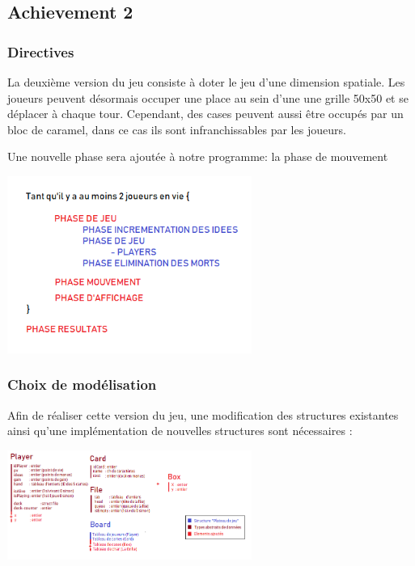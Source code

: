 \documentclass[a4paper]{article}
\begin{document}
\newpage
\subsection{Achievement 2}
\subsubsection{Directives}
La deuxième version du jeu consiste à doter le jeu d’une dimension spatiale. Les joueurs peuvent désormais occuper une place au sein d’une une grille 50x50 et se déplacer à chaque tour. Cependant, des cases peuvent aussi être occupés par un bloc de caramel, dans ce cas ils sont infranchissables par les joueurs.

Une nouvelle phase sera ajoutée à notre programme: la phase de mouvement
\begin{center}
\includegraphics[width=0.6\textwidth]{Ach2_1}\\[1cm]
\end{center}

\subsubsection{Choix de modélisation}
Afin de réaliser cette version du jeu, une modification des structures existantes ainsi qu’une implémentation de nouvelles structures sont nécessaires : \\

\begin{center}
\includegraphics[width=0.6\textwidth]{Ach2}\\[1cm]
\end{center}
\end{document}
